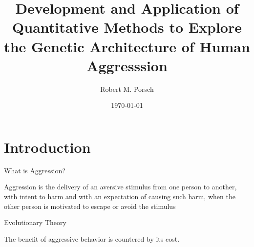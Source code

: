 \documentclass{beamer}
\title{Development and Application of Quantitative Methods to Explore the Genetic Architecture of Human Aggresssion}
\date{\today}
\author{Robert M. Porsch}
\institute{Department of Psychiatry}
\begin{document}
\maketitle
\tableofcontents

\section{Introduction}

\begin{frame}{What is Aggression?}
  \begin{center}
    \begin{displayquote}
      Aggression is the delivery of an aversive stimulus from one person to another, with intent to harm and with an expectation of causing such harm, when the other person is motivated to escape or avoid the stimulus
    \end{displayquote}
  \end{center}
\end{frame}

\begin{frame}[t]{Evolutionary Theory}
  \begin{center}
    \scalebox{0.7}{}
    The benefit of aggressive behavior is countered by its cost.
  \end{center}
\end{frame}

%
\end{document}
